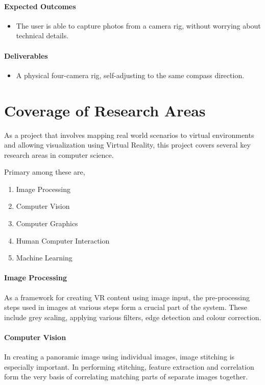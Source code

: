 \paragraph{Expected Outcomes}
\begin{itemize}
\item{The user is able to capture photos from a camera rig, without worrying about technical details.}
\end{itemize}

\paragraph{Deliverables}
\begin{itemize}
\item{A physical four-camera rig, self-adjusting to the same compass direction.}
\end{itemize}

\section{Coverage of Research Areas}
\label{intro_sec:4}

As a project that involves mapping real world scenarios to virtual environments and allowing visualization using Virtual Reality, this project covers several key research areas in computer science.

Primary among these are,
\begin{enumerate}
\item{Image Processing}
\item{Computer Vision}
\item{Computer Graphics}
\item{Human Computer Interaction}
\item{Machine Learning}
\end{enumerate}

\paragraph{Image Processing}
As a framework for creating VR content using image input, the pre-processing steps used in images at various steps form a crucial part of the system. These include grey scaling, applying various filters, edge detection and colour correction.

\paragraph{Computer Vision}
In creating a panoramic image using individual images, image stitching is especially important. In performing stitching, feature extraction and correlation form the very basis of correlating matching parts of separate images together.

